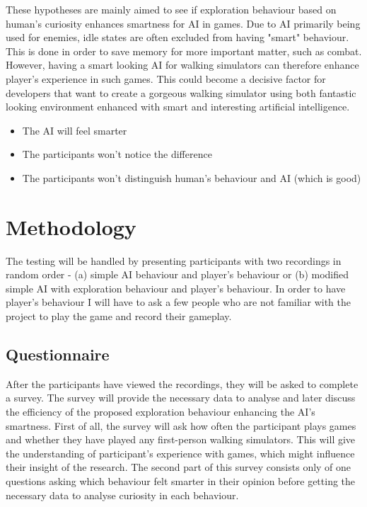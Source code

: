 \documentclass[journal]{IEEEtran}
\begin{document}
These hypotheses are mainly aimed to see if exploration behaviour based on human's curiosity enhances smartness for AI in games. Due to AI primarily being used for enemies, idle states are often excluded from having "smart" behaviour. This is done in order to save memory for more important matter, such as combat. However, having a smart looking AI for walking simulators can therefore enhance player's experience in such games. This could become a decisive factor for developers that want to create a gorgeous walking simulator using both fantastic looking environment enhanced with smart and interesting artificial intelligence.
\begin{itemize}
	\item The AI will feel smarter
	\item The participants won't notice the difference
	\item The participants won't distinguish human's behaviour and AI (which is good)
\end{itemize}

\section{Methodology}
The testing will be handled by presenting participants with two recordings in random order - (a) simple AI behaviour and player's behaviour or (b) modified simple AI with exploration behaviour and player's behaviour. In order to have player's behaviour I will have to ask a few people who are not familiar with the project to play the game and record their gameplay. 

\subsection{Questionnaire}
After the participants have viewed the recordings, they will be asked to complete a survey. The survey will provide the necessary data to analyse and later discuss the efficiency of the proposed exploration behaviour enhancing the AI's smartness. First of all, the survey will ask how often the participant plays games and whether they have played any first-person walking simulators. This will give the understanding of participant's experience with games, which might influence their insight of the research. The second part of this survey consists only of one questions asking which behaviour felt smarter in their opinion before getting the necessary data to analyse curiosity in each behaviour.
\end{document}
